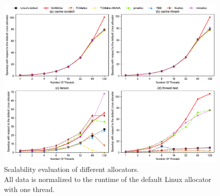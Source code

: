 \begin{figure}[!th]
    \centering
    \includegraphics[width=6.1in]{figure/sythentic-scalobility-new.pdf}
    \caption{Scalability evaluation of different allocators.\\ All data is normalized to the runtime of the default Linux allocator with one thread.}
    \label{sythentic-scalability}
\end{figure}

